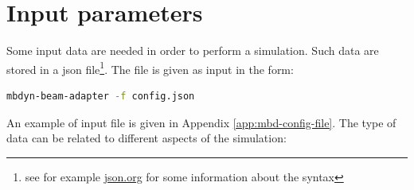 \section{Input parameters}
\label{sec:mbdyn-adapter-input}

Some input data are needed in order to perform a simulation. Such data are stored in a \acrshort{json} file\footnote{see for example \href{https://www.json.org/json-en.html}{json.org} for some information about the syntax}. The file is given as input in the form:
\begin{lstlisting}[language=bash]
mbdyn-beam-adapter -f config.json
\end{lstlisting}

An example of input file is given in Appendix \ref{app:mbd-config-file}. The type of data can be related to different aspects of the simulation:

